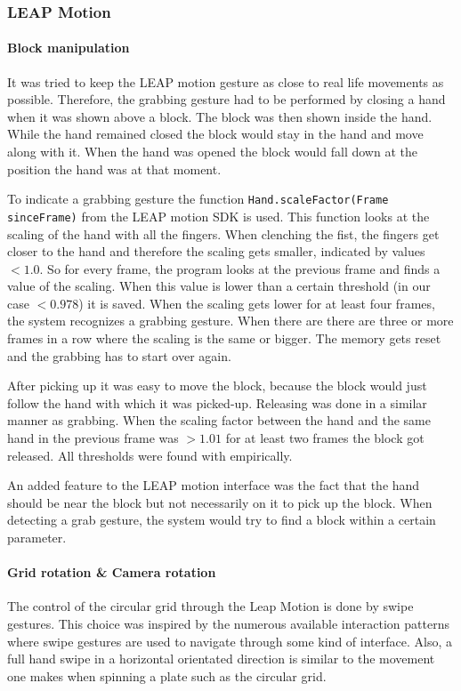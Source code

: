 \subsubsection{LEAP Motion}

\paragraph{Block manipulation}
It was tried to keep the LEAP motion gesture as close to real life movements as possible. Therefore, the grabbing gesture had to be performed by closing a hand when it was shown above a block. The block was then shown inside the hand. While the hand remained closed the block would stay in the hand and move along with it. When the hand was opened the block would fall down at the position the hand was at that moment.

To indicate a grabbing gesture the function \texttt{Hand.scaleFactor(Frame sinceFrame)} from the LEAP motion SDK is used. This function looks at the scaling of the hand with all the fingers. When clenching the fist, the fingers get closer to the hand and therefore the scaling gets smaller, indicated by values $<1.0$. So for every frame, the program looks at the previous frame and finds a value of the scaling. When this value is lower than a certain threshold (in our case $<0.978$) it is saved. When the scaling gets lower for at least four frames, the system recognizes a grabbing gesture. When there are there are three or more frames in a row where the scaling is the same or bigger. The memory gets reset and the grabbing has to start over again.

After picking up it was easy to move the block, because the block would just follow the hand with which it was picked-up. Releasing was done in a similar manner as grabbing. When the scaling factor between the hand and the same hand in the previous frame was $>1.01$ for at least two frames the block got released. All thresholds were found with empirically.

An added feature to the LEAP motion interface was the fact that the hand should be near the block but not necessarily  on it to pick up the block. When detecting a grab gesture, the system would try to find a block within a certain parameter.

\paragraph{Grid rotation \& Camera rotation}
The control of the circular grid through the Leap Motion is done by
swipe gestures. This choice was inspired by the numerous available
interaction patterns where swipe gestures are used to navigate through
some kind of interface. Also, a full hand swipe in a horizontal orientated
direction is similar to the movement one makes when spinning a plate
such as the circular grid. 

